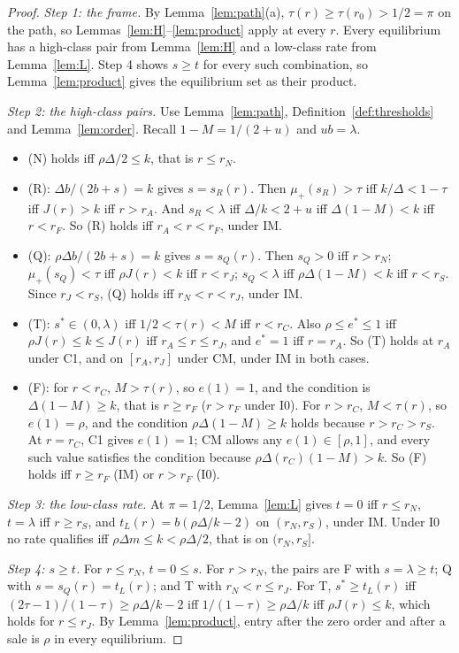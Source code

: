 \documentclass[11pt]{article}
\theoremstyle{definition}
\begin{document}
\begin{proof}
\emph{Step 1: the frame.} By Lemma~\ref{lem:path}(a), $\tau(r)\ge\tau(r_0)>1/2=\pi$ on the path, so
Lemmas~\ref{lem:H}--\ref{lem:product} apply at every $r$. Every equilibrium has a high-class pair from
Lemma~\ref{lem:H} and a low-class rate from Lemma~\ref{lem:L}. Step 4 shows $s\ge t$ for every such combination,
so Lemma~\ref{lem:product} gives the equilibrium set as their product.

\emph{Step 2: the high-class pairs.} Use Lemma~\ref{lem:path}, Definition~\ref{def:thresholds} and
Lemma~\ref{lem:order}. Recall $1-M=1/(2+u)$ and $ub=\lambda$.
\begin{itemize}
\item (N) holds iff $\rho\Delta/2\le k$, that is $r\le r_N$.
\item (R): $\Delta b/(2b+s)=k$ gives $s=s_R(r)$. Then $\mu_+(s_R)>\tau$ iff $k/\Delta<1-\tau$ iff $J(r)>k$ iff
  $r>r_A$. And $s_R<\lambda$ iff $\Delta/k<2+u$ iff $\Delta(1-M)<k$ iff $r<r_F$. So (R) holds iff $r_A<r<r_F$,
  under IM.
\item (Q): $\rho\Delta b/(2b+s)=k$ gives $s=s_Q(r)$. Then $s_Q>0$ iff $r>r_N$; $\mu_+(s_Q)<\tau$ iff $\rho J(r)<k$
  iff $r<r_J$; $s_Q<\lambda$ iff $\rho\Delta(1-M)<k$ iff $r<r_S$. Since $r_J<r_S$, (Q) holds iff $r_N<r<r_J$,
  under IM.
\item (T): $s^*\in(0,\lambda)$ iff $1/2<\tau(r)<M$ iff $r<r_C$. Also $\rho\le e^*\le1$ iff $\rho J(r)\le k\le J(r)$
  iff $r_A\le r\le r_J$, and $e^*=1$ iff $r=r_A$. So (T) holds at $r_A$ under C1, and on $[r_A,r_J]$ under CM,
  under IM in both cases.
\item (F): for $r<r_C$, $M>\tau(r)$, so $e(1)=1$, and the condition is $\Delta(1-M)\ge k$, that is $r\ge r_F$
  ($r>r_F$ under I0). For $r>r_C$, $M<\tau(r)$, so $e(1)=\rho$, and the condition $\rho\Delta(1-M)\ge k$ holds
  because $r>r_C>r_S$. At $r=r_C$, C1 gives $e(1)=1$; CM allows any $e(1)\in[\rho,1]$, and every such value
  satisfies the condition because $\rho\Delta(r_C)(1-M)>k$. So (F) holds iff $r\ge r_F$ (IM) or $r>r_F$ (I0).
\end{itemize}

\emph{Step 3: the low-class rate.} At $\pi=1/2$, Lemma~\ref{lem:L} gives $t=0$ iff $r\le r_N$, $t=\lambda$ iff
$r\ge r_S$, and $t_L(r)=b(\rho\Delta/k-2)$ on $(r_N,r_S)$, under IM. Under I0 no rate qualifies iff
$\rho\Delta m\le k<\rho\Delta/2$, that is on $(r_N,r_S]$.

\emph{Step 4: $s\ge t$.} For $r\le r_N$, $t=0\le s$. For $r>r_N$, the pairs are F with $s=\lambda\ge t$; Q with
$s=s_Q(r)=t_L(r)$; and T with $r_N<r\le r_J$. For T, $s^*\ge t_L(r)$ iff $(2\tau-1)/(1-\tau)\ge\rho\Delta/k-2$ iff
$1/(1-\tau)\ge\rho\Delta/k$ iff $\rho J(r)\le k$, which holds for $r\le r_J$. By Lemma~\ref{lem:product}, entry
after the zero order and after a sale is $\rho$ in every equilibrium.


\end{proof}
\end{document}
